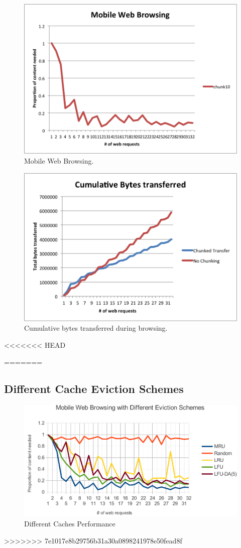 \begin{figure}[h] 
\centering \includegraphics[scale=0.40]{images/browsing.png}
\caption{Mobile Web Browsing. }
\end{figure}

\begin{figure}[h] 
\centering \includegraphics[scale=0.40]{images/cumulbrowsing.png}
\caption{Cumulative bytes transferred during browsing. }
\end{figure}

<<<<<<< HEAD


=======
\subsection{Different Cache Eviction Schemes}

\begin{figure}[h]
\centering \includegraphics[scale=0.60]{images/caches.pdf}
\caption{Different Caches Performance}
\end{figure}
>>>>>>> 7e1017e8b29756b31a30a0898241978e50fead8f
